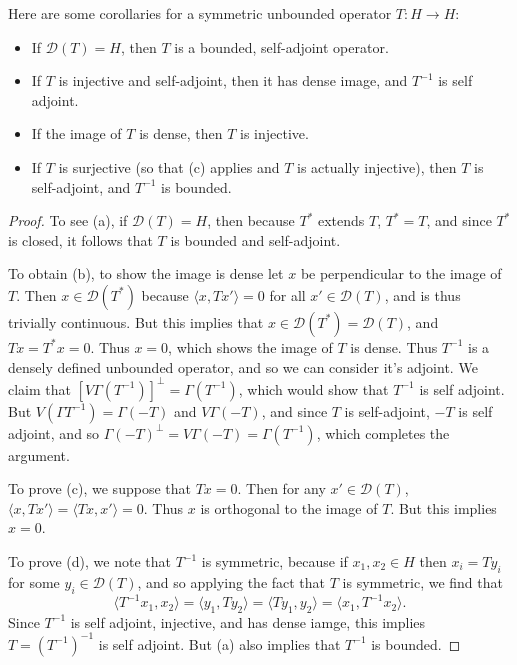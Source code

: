 Here are some corollaries for a symmetric unbounded operator $T: H \to H$:
%
\begin{itemize}
    \item If $\mathcal{D}(T) = H$, then $T$ is a bounded, self-adjoint operator.
    \item If $T$ is injective and self-adjoint, then it has dense image, and $T^{-1}$ is self adjoint.
    \item If the image of $T$ is dense, then $T$ is injective.
    \item If $T$ is surjective (so that (c) applies and $T$ is actually injective), then $T$ is self-adjoint, and $T^{-1}$ is bounded.
\end{itemize}
\begin{proof}
    To see (a), if $\mathcal{D}(T) = H$, then because $T^*$ extends $T$, $T^* = T$, and since $T^*$ is closed, it follows that $T$ is bounded and self-adjoint. 

    To obtain (b), to show the image is dense let $x$ be perpendicular to the image of $T$. Then $x \in \mathcal{D}(T^*)$ because $\langle x, Tx' \rangle = 0$ for all $x' \in \mathcal{D}(T)$, and is thus trivially continuous. But this implies that $x \in \mathcal{D}(T^*) = \mathcal{D}(T)$, and $Tx = T^*x = 0$. Thus $x = 0$, which shows the image of $T$ is dense. Thus $T^{-1}$ is a densely defined unbounded operator, and so we can consider it's adjoint. We claim that $[V\Gamma(T^{-1})]^\perp = \Gamma(T^{-1})$, which would show that $T^{-1}$ is self adjoint. But $V(\Gamma T^{-1}) = \Gamma(-T)$ and $V \Gamma(-T)$, and since $T$ is self-adjoint, $-T$ is self adjoint, and so $\Gamma(-T)^\perp = V \Gamma(-T) = \Gamma(T^{-1})$, which completes the argument.

    To prove (c), we suppose that $Tx = 0$. Then for any $x' \in \mathcal{D}(T)$, $\langle x, Tx' \rangle = \langle Tx, x' \rangle = 0$. Thus $x$ is orthogonal to the image of $T$. But this implies $x = 0$.

    To prove (d), we note that $T^{-1}$ is symmetric, because if $x_1,x_2 \in H$ then $x_i = Ty_i$ for some $y_i \in \mathcal{D}(T)$, and so applying the fact that $T$ is symmetric, we find that
    \[ \langle T^{-1} x_1, x_2 \rangle = \langle y_1, Ty_2 \rangle = \langle Ty_1, y_2 \rangle = \langle x_1, T^{-1} x_2 \rangle. \]
    Since $T^{-1}$ is self adjoint, injective, and has dense iamge, this implies $T = (T^{-1})^{-1}$ is self adjoint. But (a) also implies that $T^{-1}$ is bounded.
\end{proof}

